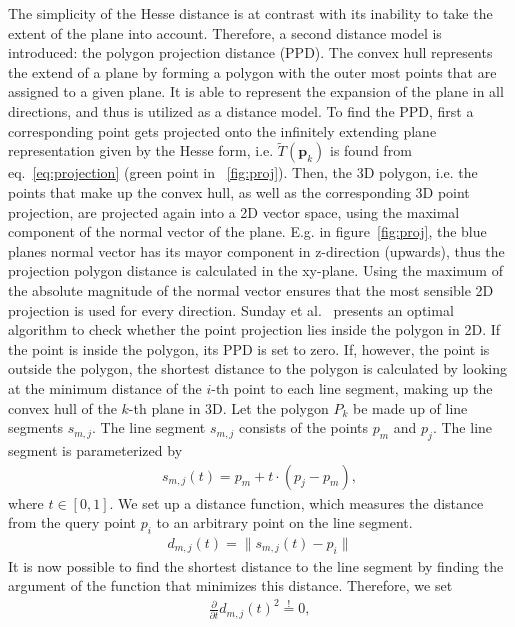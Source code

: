\documentclass[5p]{elsarticle}
\renewcommand{\vec}[1]{\mathbf{#1}}
\newcommand{\pardiff}[1]{\frac{\partial}{\partial #1}}
\providecommand{\DIFaddtex}[1]{{\protect\color{blue}\uwave{#1}}} %
\providecommand{\DIFaddbegin}{} %
\providecommand{\DIFaddend}{} %
\providecommand{\DIFadd}[1]{\texorpdfstring{\DIFaddtex{#1}}{#1}} %
\begin{document}
The simplicity of the Hesse distance is at contrast with its inability to take the extent of the plane into account.
Therefore, a second distance model is introduced: the polygon projection distance (PPD).
The convex hull represents the extend of a plane by forming a polygon with the outer most points that are assigned to a given plane. 
It is able to represent the expansion of the plane in all directions, and thus is utilized as a distance model.
To find the PPD, first a corresponding point gets projected onto the infinitely extending plane representation given by the Hesse form, i.e. $\widetilde{T}(\vec{p}_k)$ is found from eq.~\eqref{eq:projection} (green point in \DIFaddbegin \DIFadd{figure}\DIFaddend ~\ref{fig:proj}).
Then, the 3D polygon, i.e. the points that make up the convex hull, as well as the corresponding 3D point projection, are projected again into a 2D vector space, using the maximal component of the normal vector of the plane.
E.g. in figure~\ref{fig:proj}, the blue planes normal vector has its mayor component in z-direction (upwards), thus the projection polygon distance is calculated in the xy-plane.
Using the maximum of the absolute magnitude of the normal vector ensures that the most sensible 2D projection is used for every direction.
Sunday et al.~\cite{pga} presents an optimal algorithm to check whether the point projection lies inside the polygon in 2D. 
If the point is inside the polygon, its PPD is set to zero.
If, however, the point is outside the polygon, the shortest distance to the polygon is calculated by looking at the minimum distance of the $i$-th point to each line segment, making up the convex hull of the $k$-th plane in 3D.
Let the polygon $P_k$ be made up of line segments $s_{m, j}$.
The line segment $s_{m, j}$ consists of the points $p_m$ and $p_j$.
The line segment is parameterized by
\begin{align}
\label{eq:line}
	s_{m, j}(t) = p_m + t \cdot \left( p_j - p_m \right) ,  
\end{align}
where $t \in \left[ 0, 1 \right]$. 
We set up a distance function, which measures the distance from the query point $p_i$ to an arbitrary point on the line segment.
\begin{align}
	\label{eq:dist}
	d_{m, j}(t) = \lVert s_{m, j}(t) - p_i \rVert 
\end{align} 
It is now possible to find the shortest distance to the line segment by finding the argument of the function that minimizes this distance.
Therefore, we set
\begin{align}
	\pardiff{t} d_{m, j}(t)^2 \overset{!}{=} 0 ,
\end{align}  
\end{document}

